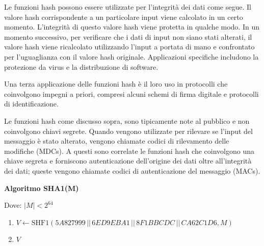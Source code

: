 \documentclass{article}
\theoremstyle{definition}
\begin{document}
Le funzioni hash possono essere utilizzate per l'integrità dei dati come segue. Il valore hash corrispondente a un particolare input viene calcolato in un certo momento. L'integrità di questo valore hash viene protetta in qualche modo. In un momento successivo, per verificare che i dati di input non siano stati alterati, il valore hash viene ricalcolato utilizzando l'input a portata di mano e confrontato per l'uguaglianza con il valore hash originale. Applicazioni specifiche includono la protezione da virus e la distribuzione di software.

Una terza applicazione delle funzioni hash è il loro uso in protocolli che coinvolgono impegni a priori, compresi alcuni schemi di firma digitale e protocolli di identificazione.

    
    
    

Le funzioni hash come discusso sopra, sono tipicamente note al pubblico e non coinvolgono chiavi segrete. Quando vengono utilizzate per rilevare se l'input del messaggio è stato alterato, vengono chiamate codici di rilevamento delle modifiche (MDCs). A questi sono correlate le funzioni hash che coinvolgono una chiave segreta e forniscono autenticazione dell'origine dei dati oltre all'integrità dei dati; queste vengono chiamate codici di autenticazione del messaggio (MACs).

\begin{mdframed}
\begin{center}
    \vspace{10pt}
    \textbf{Algoritmo SHA1(M)}
    \vspace{10pt}
\end{center} 
Dove: $|M| < 2^{64}$
\begin{enumerate}
    \item $V \leftarrow \text{SHF1}( 5A827999 \, || \, 6ED9EBA1 \, || \, 8F1BBCDC \, || \, CA62C1D6, M )$ 
    \item {} $V$
\end{enumerate}
\end{mdframed}
\end{document}
